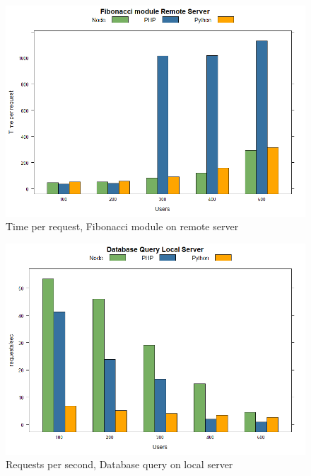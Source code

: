 \documentclass[../thesis.tex]{subfiles}
\begin{document}
	\begin{figure}[H]
		\centering
		\includegraphics[width=1\textwidth]{../images/fibRemotetpr.png}
		\caption{Time per request, Fibonacci module on remote server}
		\label{rys1}
	\end{figure}
	\begin{figure}[H]
		\centering
		\includegraphics[width=1\textwidth]{../images/dbLocalreq.png}
		\caption{Requests per second, Database query on local server}
		\label{rys1}
	\end{figure}
\end{document}
